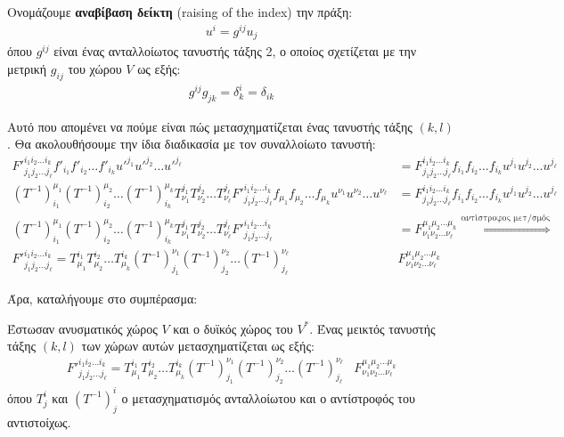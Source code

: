 \documentclass[main.tex]{subfiles}
\begin{document}
	\begin{definition}
		Ονομάζουμε \textbf{αναβίβαση δείκτη} (raising of the index) την πράξη:
		\begin{align*}
			u^i = g^{ij}u_j
		\end{align*}
		όπου $g^{ij}$ είναι ένας ανταλλοίωτος τανυστής τάξης 2, ο οποίος σχετίζεται με την μετρική $g_{ij}$ του χώρου $V$ ως εξής:
		\begin{align*}
			g^{ij}g_{jk} = \delta^i_k = \delta_{ik}
		\end{align*} 
	\end{definition} 
	
	Αυτό που απομένει να πούμε είναι πώς μετασχηματίζεται ένας τανυστής τάξης $(k,l)$. Θα ακολουθήσουμε την ίδια διαδικασία με τον συναλλοίωτο τανυστή:
	\begin{align*}
		F'^{i_1i_2\ldots i_k}_{j_1j_2\ldots j_\ell}f'_{i_1}f'_{i_2}\ldots f'_{i_k}u'^{j_1}u'^{j_2}\ldots u'^{j_\ell} &= F^{i_1i_2\ldots i_k}_{j_1j_2\ldots j_\ell}f_{i_1}f_{i_2}\ldots f_{i_k}u^{j_1}u^{j_2}\ldots u^{j_\ell}\\
		(T^{-1})^{\mu_1}_{i_1}(T^{-1})^{\mu_2}_{i_2}\ldots(T^{-1})^{\mu_k}_{i_k}T^{j_1}_{\nu_1}T^{j_2}_{\nu_2}\ldots T^{j_\ell}_{\nu_\ell}F'^{i_1i_2\ldots i_k}_{j_1j_2\ldots j_\ell}f_{\mu_1}f_{\mu_2}\ldots f_{\mu_k}u^{\nu_1}u^{\nu_2}\ldots u^{\nu_\ell}&= F^{i_1i_2\ldots i_k}_{j_1j_2\ldots j_\ell}f_{i_1}f_{i_2}\ldots f_{i_k}u^{j_1}u^{j_2}\ldots u^{j_\ell}\\
		(T^{-1})^{\mu_1}_{i_1}(T^{-1})^{\mu_2}_{i_2}\ldots(T^{-1})^{\mu_k}_{i_k}T^{j_1}_{\nu_1}T^{j_2}_{\nu_2}\ldots T^{j_\ell}_{\nu_\ell}F'^{i_1i_2\ldots i_k}_{j_1j_2\ldots j_\ell} &= F^{\mu_1\mu_2\ldots \mu_k}_{\nu_1\nu_2\ldots \nu_\ell} \overset{\text{αντίστροφος μετ/σμός}}{\Leftrightarrow}\\
		F'^{i_1i_2\ldots i_k}_{j_1j_2\ldots j_\ell} = T^{i_1}_{\mu_1}T^{i_2}_{\mu_2}\ldots T^{i_k}_{\mu_k}(T^{-1})^{\nu_1}_{j_1}(T^{-1})^{\nu_2}_{j_2}\ldots(T^{-1})^{\nu_\ell}_{j_\ell}&F^{\mu_1\mu_2\ldots \mu_k}_{\nu_1\nu_2\ldots \nu_\ell}
	\end{align*}

	Άρα, καταλήγουμε στο συμπέρασμα:
	\begin{theorem}
		Έστωσαν ανυσματικός χώρος $V$ και ο δυϊκός χώρος του $V^*$. Ένας μεικτός τανυστής τάξης $(k,l)$ των χώρων αυτών μετασχηματίζεται ως εξής:
		\begin{align*}
			F'^{i_1i_2\ldots i_k}_{j_1j_2\ldots j_\ell} = T^{i_1}_{\mu_1}T^{i_2}_{\mu_2}\ldots T^{i_k}_{\mu_k}(T^{-1})^{\nu_1}_{j_1}(T^{-1})^{\nu_2}_{j_2}\ldots(T^{-1})^{\nu_\ell}_{j_\ell}&F^{\mu_1\mu_2\ldots \mu_k}_{\nu_1\nu_2\ldots \nu_\ell}
		\end{align*}
		όπου $T^i_j$ και $(T^{-1})^i_j$ ο μετασχηματισμός ανταλλοίωτου και ο αντίστροφός του αντιστοίχως.
	\end{theorem}
\end{document}
